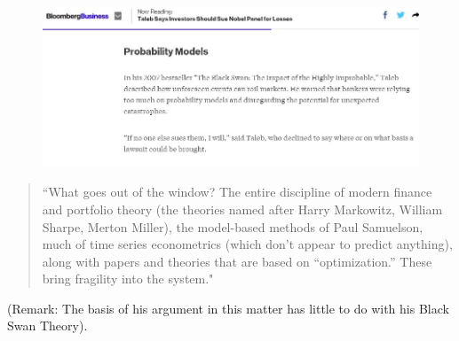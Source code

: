 \documentclass[MAIN.tex]{subfiles}
\begin{document}
	\begin{frame}
\begin{figure}
\centering
\includegraphics[width=1.05\linewidth]{images/taleb2}

\end{figure}
		
	\end{frame}	
	\begin{frame}
		\large
	\begin{framed}
		\begin{quote}
	``What goes out of the window? The entire discipline of modern finance and portfolio theory (the theories named after Harry Markowitz, William Sharpe, Merton Miller), the model-based methods of Paul Samuelson, much of time series econometrics (which don’t appear to predict anything), along with papers and theories that are based on “optimization.” These bring fragility into the system."
	\end{quote}
	\end{framed}
	
	(Remark: The basis of his argument in this matter has little to do with his Black Swan Theory).
	\end{frame}
\end{document}
